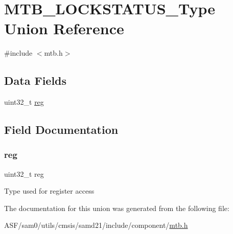 \hypertarget{union_m_t_b___l_o_c_k_s_t_a_t_u_s___type}{}\section{M\+T\+B\+\_\+\+L\+O\+C\+K\+S\+T\+A\+T\+U\+S\+\_\+\+Type Union Reference}
\label{union_m_t_b___l_o_c_k_s_t_a_t_u_s___type}


{\ttfamily \#include $<$mtb.\+h$>$}

\subsection*{Data Fields}
\begin{DoxyCompactItemize}
\item 
uint32\+\_\+t \mbox{\hyperlink{union_m_t_b___l_o_c_k_s_t_a_t_u_s___type_a6b91636401516a477989a336376d7b40}{reg}}
\end{DoxyCompactItemize}


\subsection{Field Documentation}
\mbox{\label{union_m_t_b___l_o_c_k_s_t_a_t_u_s___type_a6b91636401516a477989a336376d7b40}} 
\subsubsection{\texorpdfstring{reg}{reg}}
{\footnotesize\ttfamily uint32\+\_\+t reg}

Type used for register access 

The documentation for this union was generated from the following file\+:\begin{DoxyCompactItemize}
\item 
A\+S\+F/sam0/utils/cmsis/samd21/include/component/\mbox{\hyperlink{component_2mtb_8h}{mtb.\+h}}\end{DoxyCompactItemize}
